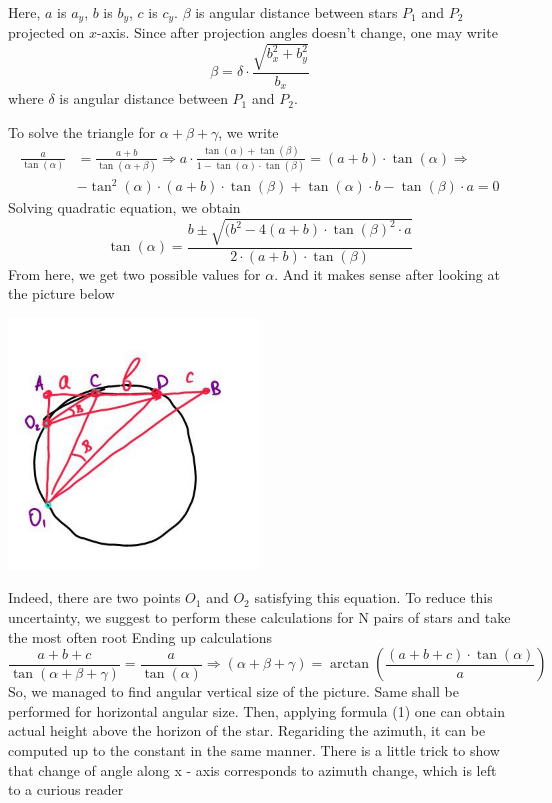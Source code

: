 \documentclass[a4paper,12pt]{article}
\begin{document}
\par
Here, \(a\) is \(a_y\), \(b\) is \(b_y\), \(c\) is \(c_y\). \(\beta\) is angular distance between stars \(P_1\) and \(P_2\) projected on \(x\)-axis. Since after projection angles doesn't change, one may write
\begin{equation}
\beta = \delta \cdot \frac{\sqrt{b_x^2 + b_y ^ 2}}{b_x}
\end{equation}
where \(\delta\) is angular distance between \(P_1\) and \(P_2\).
\par
To solve the triangle for \(\alpha + \beta + \gamma\), we write
\begin{equation}
    \begin{split}
        \frac{a}{\tan(\alpha)} &= \frac{a+b}{\tan(\alpha + \beta)} \Rightarrow 
        a \cdot \frac{\tan(\alpha) + \tan(\beta)}{1 - \tan(\alpha) \cdot \tan(\beta)} =
        (a+b) \cdot \tan(\alpha) \Rightarrow \\
        &-\tan^2(\alpha) \cdot (a + b) \cdot \tan(\beta) + \tan(\alpha) \cdot b - \tan(\beta) \cdot a = 0
    \end{split}
\end{equation}
Solving quadratic equation, we obtain
\begin{equation}
\tan(\alpha) = \frac{b \pm \sqrt{(b ^ 2 - 4 (a + b) \cdot \tan(\beta) ^ 2 \cdot a}}{2 \cdot (a + b) \cdot \tan(\beta)}
\end{equation}
From here, we get two possible values for \(\alpha\). And it makes sense after looking at the picture below
\par
   \centering
    \includegraphics[width=0.5\textwidth]{2_cases.jpg}
\par
Indeed, there are two points \(O_1\) and \(O_2\) satisfying this equation.
To reduce this uncertainty, we suggest to perform these calculations for N pairs of stars and take the most often root
Ending up calculations
\begin{equation}
    \frac{a + b + c}{\tan(\alpha + \beta + \gamma)} = \frac{a}{\tan(\alpha)}
    \Rightarrow (\alpha + \beta + \gamma) = \arctan\left(\frac{(a + b + c) \cdot \tan(\alpha)}{a}\right)
\end{equation}
So, we managed to find angular vertical size of the picture. Same shall be performed for horizontal angular size.
Then, applying formula (1) one can obtain actual height above the horizon of the star. Regariding the azimuth, it can be computed up to the constant in the same manner. There is a little trick to show that change of angle along x - axis corresponds to azimuth change, which is left to a curious reader
\par \par
\end{document}
